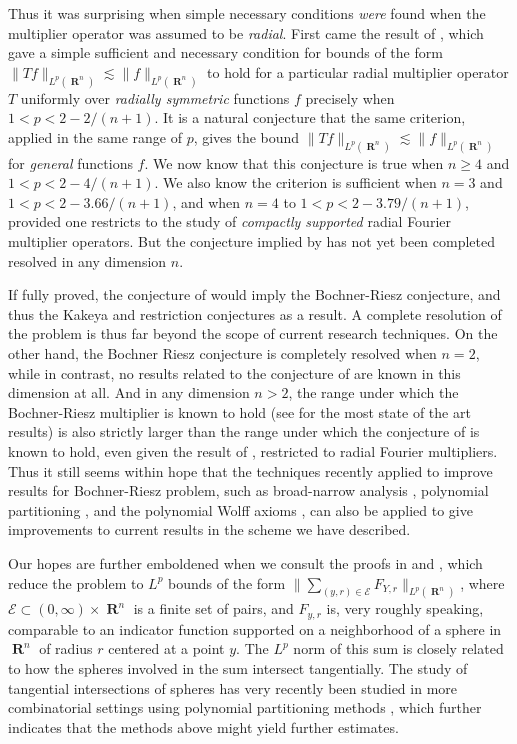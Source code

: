 \documentclass[12pt]{article}
\DeclareMathOperator{\RR}{\mathbf{R}}
\theoremstyle{plain}
\theoremstyle{remark}
\theoremstyle{definition}
\begin{document}
Thus it was surprising when simple necessary conditions \emph{were} found when the multiplier operator was assumed to be \emph{radial}. First came the result of \cite{GarrigosandSeeger}, which gave a simple sufficient and necessary condition for bounds of the form $\| Tf \|_{L^p(\RR^n)} \lesssim \| f \|_{L^p(\RR^n)}$ to hold for a particular radial multiplier operator $T$ uniformly over \emph{radially symmetric} functions $f$ precisely when $1 < p < 2 - 2/(n+1)$. It is a natural conjecture that the same criterion, applied in the same range of $p$, gives the bound $\| Tf \|_{L^p(\RR^n)} \lesssim \| f \|_{L^p(\RR^n)}$ for \emph{general} functions $f$. We now know \cite{HeoandNazarovandSeeger} that this conjecture is true when $n \geq 4$ and $1 < p < 2 - 4/(n+1)$. We also know \cite{Cladek} the criterion is sufficient when $n = 3$ and $1 < p < 2 - 3.66/(n+1)$, and when $n = 4$ to $1 < p < 2 - 3.79/(n+1)$, provided one restricts to the study of \emph{compactly supported} radial Fourier multiplier operators. But the conjecture implied by \cite{GarrigosandSeeger} has not yet been completed resolved in any dimension $n$.

If fully proved, the conjecture of \cite{GarrigosandSeeger} would imply the Bochner-Riesz conjecture, and thus the Kakeya and restriction conjectures as a result. A complete resolution of the problem is thus far beyond the scope of current research techniques. On the other hand, the Bochner Riesz conjecture is completely resolved when $n = 2$, while in contrast, no results related to the conjecture of \cite{GarrigosandSeeger} are known in this dimension at all. And in any dimension $n > 2$, the range under which the Bochner-Riesz multiplier is known to hold (see \cite{GuoandOhandWangandWuandZhang} for the most state of the art results) is also strictly larger than the range under which the conjecture of \cite{GarrigosandSeeger} is known to hold, even given the result of \cite{Cladek}, restricted to radial Fourier multipliers. Thus it still seems within hope that the techniques recently applied to improve results for Bochner-Riesz problem, such as broad-narrow analysis \cite{BourgainandGuth}, polynomial partitioning \cite{GuthTextbook}, and the polynomial Wolff axioms \cite{KatzandRogers}, can also be applied to give improvements to current results in the scheme we have described.

Our hopes are further emboldened when we consult the proofs in \cite{HeoandNazarovandSeeger} and \cite{Cladek}, which reduce the problem to $L^p$ bounds of the form $\| \sum_{(y,r) \in \mathcal{E}} F_{Y,r} \|_{L^p(\RR^n)}$, where $\mathcal{E} \subset (0,\infty) \times \RR^n$ is a finite set of pairs, and $F_{y,r}$ is, very roughly speaking, comparable to an indicator function supported on a neighborhood of a sphere in $\RR^n$ of radius $r$ centered at a point $y$. The $L^p$ norm of this sum is closely related to how the spheres involved in the sum intersect tangentially. The study of tangential intersections of spheres has very recently been studied in more combinatorial settings using polynomial partitioning methods \cite{Zahl}, which further indicates that the methods above might yield further estimates.
\end{document}
